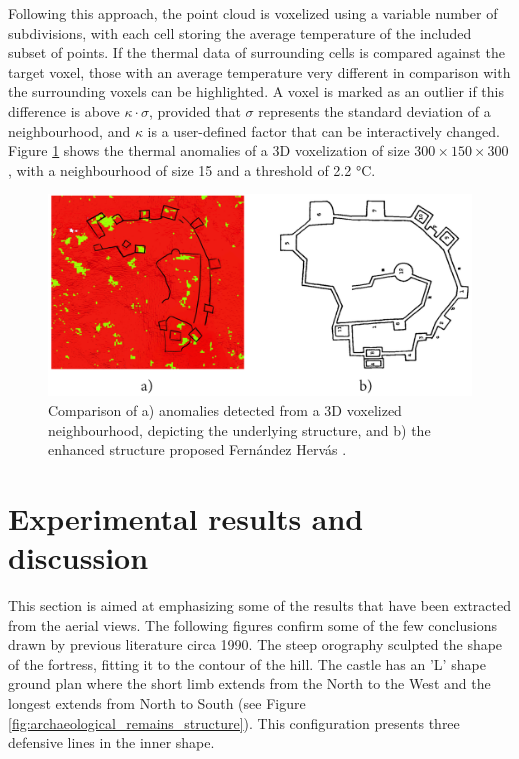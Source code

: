 Following this approach, the point cloud is voxelized using a variable number of subdivisions, with each cell storing the average temperature of the included subset of points. If the thermal data of surrounding cells is compared against the target voxel, those with an average temperature very different in comparison with the surrounding voxels can be highlighted. A voxel is marked as an outlier if this difference is above $\kappa \cdot \sigma$, provided that $\sigma$ represents the standard deviation of a neighbourhood, and $\kappa$ is a user-defined factor that can be interactively changed. Figure \ref{fig:voxel_anomalies} shows the thermal anomalies of a 3D voxelization of size $300 \times 150 \times 300$, with a neighbourhood of size 15 and a threshold of 2.2 \si{\celsius}.

\begin{figure}[ht]
    \centering
    \includegraphics[width=\linewidth]{figs/castle_puerta_arenas/voxel_anomalies_highlighted.png}
	\caption{Comparison of a) anomalies detected from a 3D voxelized neighbourhood, depicting the underlying structure, and b) the enhanced structure proposed Fernández Hervás \cite{fernandez_hervas_castillo_1986}.}
	\label{fig:voxel_anomalies}
\end{figure}


\section{Experimental results and discussion}

This section is aimed at emphasizing some of the results that have been extracted from the aerial views. The following figures confirm some of the few conclusions drawn by previous literature circa 1990. The steep orography sculpted the shape of the fortress, fitting it to the contour of the hill. The castle has an 'L' shape ground plan where the short limb extends from the North to the West and the longest extends from North to South (see Figure \ref{fig:archaeological_remains_structure}). This configuration presents three defensive lines in the inner shape. 

